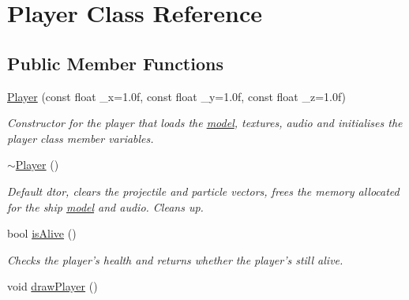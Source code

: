 \hypertarget{classPlayer}{
\section{Player Class Reference}
\label{classPlayer}
}
\subsection*{Public Member Functions}
\begin{DoxyCompactItemize}
\item 
\hyperlink{classPlayer_a699a172ce5dd9adcf86c394872ccae86}{Player} (const float \_\-x=1.0f, const float \_\-y=1.0f, const float \_\-z=1.0f)
\begin{DoxyCompactList}\small\item\em Constructor for the player that loads the \hyperlink{structmodel}{model}, textures, audio and initialises the player class member variables. \item\end{DoxyCompactList}\item 
\hypertarget{classPlayer_a749d2c00e1fe0f5c2746f7505a58c062}{
\hyperlink{classPlayer_a749d2c00e1fe0f5c2746f7505a58c062}{$\sim$Player} ()}
\label{classPlayer_a749d2c00e1fe0f5c2746f7505a58c062}

\begin{DoxyCompactList}\small\item\em Default dtor, clears the projectile and particle vectors, frees the memory allocated for the ship \hyperlink{structmodel}{model} and audio. Cleans up. \item\end{DoxyCompactList}\item 
bool \hyperlink{classPlayer_a06e38c0f57e67eb006c9d09779bd8f8f}{isAlive} ()
\begin{DoxyCompactList}\small\item\em Checks the player's health and returns whether the player's still alive. \item\end{DoxyCompactList}\item 
\hypertarget{classPlayer_a2f8ee4f71ca93f8c5546d06247794fdd}{
void \hyperlink{classPlayer_a2f8ee4f71ca93f8c5546d06247794fdd}{drawPlayer} ()}
\label{classPlayer_a2f8ee4f71ca93f8c5546d06247794fdd}


\end{DoxyCompactItemize}
